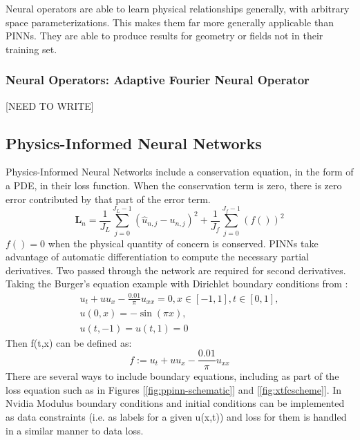 \documentclass[]{article}
\begin{document}
Neural operators are able to learn physical relationships generally, with arbitrary space parameterizations.  This makes them far more generally applicable than PINNs.  They are able to produce results for geometry or fields not in their training set.

\subsubsection{Neural Operators: Adaptive Fourier Neural Operator}
[NEED TO WRITE]

\subsection{Physics-Informed Neural Networks}
Physics-Informed Neural Networks include a conservation equation, in the form of a PDE, in their loss function.  When the conservation term is zero, there is zero error contributed by that part of the error term.
\begin{equation}
\textbf{L}_n = \frac{1}{J_L} \sum_{j=0}^{J_L -1} (\hat{u}_{n,j} - u_{n,j})^2 + \frac{1}{J_f}\sum_{j=0}^{J_f - 1}(f())^2
\end{equation}
$f() = 0$ when the physical quantity of concern is conserved.  PINNs take advantage of automatic differentiation to compute the necessary partial derivatives.  Two passed through the network are required for second derivatives.  Taking the Burger's equation example with Dirichlet boundary conditions from \cite{pinn_part1}:
\begin{gather}
u_t + uu_x - \frac{0.01}{\pi}u_{xx} = 0, x \in[-1, 1], t\in[0,1],\\
u(0,x) = -\sin(\pi x), \\
u(t, -1) = u(t, 1) = 0
\end{gather}
Then f(t,x) can be defined as:
\begin{equation}
f:= u_t + uu_x - \frac{0.01}{\pi}u_{xx}
\end{equation}
There are several ways to include boundary equations, including as part of the loss equation such as in Figures [\ref{fig:ppinn-schematic}] and [\ref{fig:xtfcscheme}].  In Nvidia Modulus \cite{nvidia_modulus} boundary conditions and initial conditions can be implemented as data constraints (i.e. as labels for a given u(x,t)) and loss for them is handled in a similar manner to data loss. 
\end{document}
